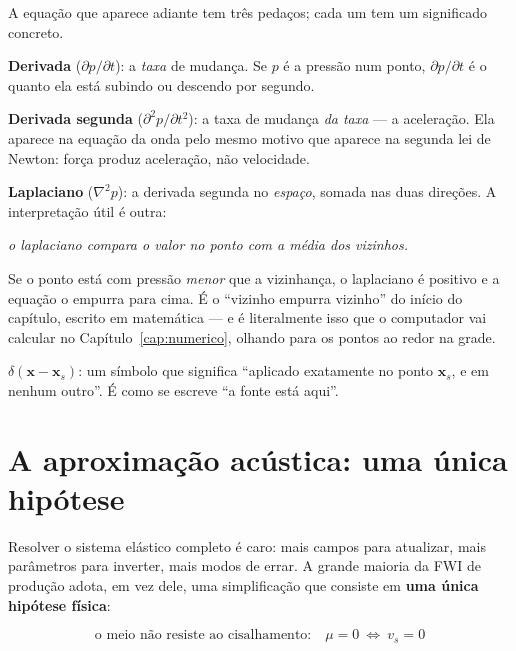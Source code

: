 \documentclass[11pt,a4paper,oneside]{report}
\begin{document}
\begin{matematica}
A equa\c{c}\~ao que aparece adiante tem tr\^es peda\c{c}os; cada um tem um
significado concreto.

\textbf{Derivada} ($\partial p/\partial t$): a \emph{taxa} de mudan\c{c}a. Se
$p$ \'e a press\~ao num ponto, $\partial p/\partial t$ \'e o quanto ela est\'a
subindo ou descendo por segundo.

\textbf{Derivada segunda} ($\partial^{2}p/\partial t^{2}$): a taxa de mudan\c{c}a
\emph{da taxa} --- a acelera\c{c}\~ao. Ela aparece na equa\c{c}\~ao da onda
pelo mesmo motivo que aparece na segunda lei de Newton: for\c{c}a produz
acelera\c{c}\~ao, n\~ao velocidade.

\textbf{Laplaciano} ($\nabla^{2}p$): a derivada segunda no \emph{espa\c{c}o},
somada nas duas dire\c{c}\~oes. A interpreta\c{c}\~ao \'util \'e outra:
\begin{center}
\emph{o laplaciano compara o valor no ponto com a m\'edia dos vizinhos.}
\end{center}
Se o ponto est\'a com press\~ao \emph{menor} que a vizinhan\c{c}a, o
laplaciano \'e positivo e a equa\c{c}\~ao o empurra para cima. \'E o
``vizinho empurra vizinho'' do in\'icio do cap\'itulo, escrito em
matem\'atica --- e \'e literalmente isso que o computador vai calcular no
Cap\'itulo~\ref{cap:numerico}, olhando para os pontos ao redor na grade.

\textbf{$\delta(\mathbf{x}-\mathbf{x}_s)$}: um s\'imbolo que significa
``aplicado exatamente no ponto $\mathbf{x}_s$, e em nenhum outro''. \'E como se
escreve ``a fonte est\'a aqui''.
\end{matematica}

\section{A aproxima\c{c}\~ao ac\'ustica: uma \'unica hip\'otese}

Resolver o sistema el\'astico completo \'e caro: mais campos para atualizar,
mais par\^ametros para inverter, mais modos de errar. A grande maioria da FWI
de produ\c{c}\~ao adota, em vez dele, uma simplifica\c{c}\~ao que consiste em
\textbf{uma \'unica hip\'otese f\'isica}:

\begin{equation}
\boxed{\ \text{o meio n\~ao resiste ao cisalhamento:}\quad \mu = 0
\ \Longleftrightarrow\ v_s = 0\ }
\label{eq:mu0}
\end{equation}
\end{document}
